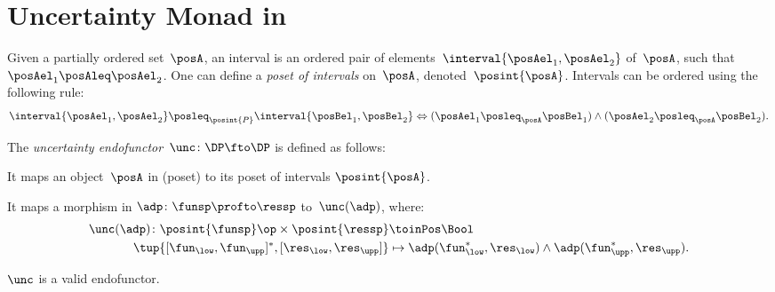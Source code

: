 \section{Uncertainty Monad in \DP}


\begin{definition}
Given a partially ordered set~$\posA$, an interval is an ordered pair of elements~$\interval{\posAel_1,\posAel_2}$ of~$\posA$, such that~$\posAel_1\posAleq \posAel_2$.
One can define a \emph{poset of intervals} on~$\posA$, denoted~$\posint{\posA}$. Intervals can be ordered using the following rule:
\begin{equation}
    \interval{\posAel_1,\posAel_2}\posleq_{\posint{P}}\interval{\posBel_1,\posBel_2} \Leftrightarrow (\posAel_1\posleq_\posA \posBel_1) \wedge (\posAel_2\posleq_\posA \posBel_2).
\end{equation}
\end{definition}


\begin{definition}
  \label{def:uncertainty-endofunctor}
    \label{def:unc-endof}
The \emph{uncertainty endofunctor}~$\unc\colon \DP\fto \DP$ is defined as follows:
\begin{compactenum}
  \item It maps an object~$\posA$ in \DP (poset) to its poset of intervals $\posint{\posA}$.
  \item It maps a morphism in \DP $\adp \colon \funsp \profto \ressp$ to~$\unc(\adp)$, where:
  \begin{equation}
  \label{eq:unc_dp}
    \begin{aligned}
      \unc(\adp)\colon \posint{\funsp}\op \times \posint{\ressp}&\toinPos \Bool\\
      \tup{[\fun_{\low},\fun_{\upp}]^*,[\res_{\low},\res_{\upp}]}&\mapsto \adp(\fun_{\low}^*,\res_{\low})\wedge  \adp(\fun_{\upp}^*,\res_{\upp}).
    \end{aligned}
  \end{equation}
\end{compactenum}
\end{definition}

\begin{lemma}
\label{lem:uncendofunctor}
$\unc$ is a valid  endofunctor.
\end{lemma}

